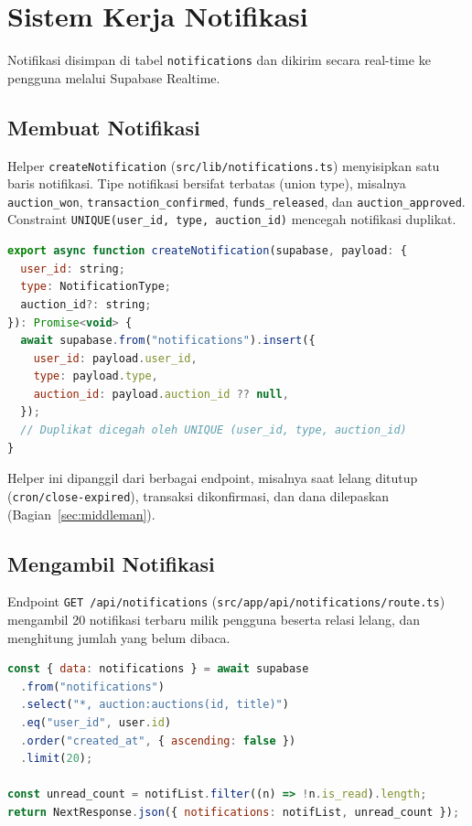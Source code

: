 \section{Sistem Kerja Notifikasi}
\label{sec:notifikasi}

Notifikasi disimpan di tabel \texttt{notifications} dan dikirim secara
real-time ke pengguna melalui Supabase Realtime.

\subsection{Membuat Notifikasi}
Helper \texttt{createNotification} (\texttt{src/lib/notifications.ts})
menyisipkan satu baris notifikasi. Tipe notifikasi bersifat terbatas (union
type), misalnya \texttt{auction\_won}, \texttt{transaction\_confirmed},
\texttt{funds\_released}, dan \texttt{auction\_approved}. Constraint
\texttt{UNIQUE(user\_id, type, auction\_id)} mencegah notifikasi duplikat.

\begin{lstlisting}[language=JavaScript,caption={Helper pembuat notifikasi (notifications.ts)}]
export async function createNotification(supabase, payload: {
  user_id: string;
  type: NotificationType;
  auction_id?: string;
}): Promise<void> {
  await supabase.from("notifications").insert({
    user_id: payload.user_id,
    type: payload.type,
    auction_id: payload.auction_id ?? null,
  });
  // Duplikat dicegah oleh UNIQUE (user_id, type, auction_id)
}
\end{lstlisting}

Helper ini dipanggil dari berbagai endpoint, misalnya saat lelang ditutup
(\texttt{cron/close-expired}), transaksi dikonfirmasi, dan dana dilepaskan
(Bagian~\ref{sec:middleman}).

\subsection{Mengambil Notifikasi}
Endpoint \texttt{GET /api/notifications}
(\texttt{src/app/api/notifications/route.ts}) mengambil 20 notifikasi terbaru
milik pengguna beserta relasi lelang, dan menghitung jumlah yang belum dibaca.

\begin{lstlisting}[language=JavaScript,caption={Pengambilan notifikasi (notifications/route.ts)}]
const { data: notifications } = await supabase
  .from("notifications")
  .select("*, auction:auctions(id, title)")
  .eq("user_id", user.id)
  .order("created_at", { ascending: false })
  .limit(20);

const unread_count = notifList.filter((n) => !n.is_read).length;
return NextResponse.json({ notifications: notifList, unread_count });
\end{lstlisting}

